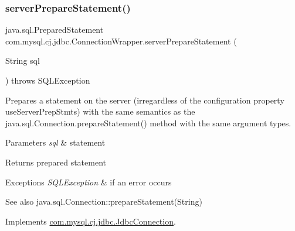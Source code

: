 \subsubsection{\texorpdfstring{server\+Prepare\+Statement()}{serverPrepareStatement()}\hspace{0.1cm}{\footnotesize\ttfamily [1/6]}}
{\footnotesize\ttfamily java.\+sql.\+Prepared\+Statement com.\+mysql.\+cj.\+jdbc.\+Connection\+Wrapper.\+server\+Prepare\+Statement (\begin{DoxyParamCaption}\item[{String}]{sql }\end{DoxyParamCaption}) throws S\+Q\+L\+Exception}

Prepares a statement on the server (irregardless of the configuration property \textquotesingle{}use\+Server\+Prep\+Stmts\textquotesingle{}) with the same semantics as the java.\+sql.\+Connection.\+prepare\+Statement() method with the same argument types.


\begin{DoxyParams}{Parameters}
{\em sql} & statement \\
\hline
\end{DoxyParams}
\begin{DoxyReturn}{Returns}
prepared statement 
\end{DoxyReturn}

\begin{DoxyExceptions}{Exceptions}
{\em S\+Q\+L\+Exception} & if an error occurs \\
\hline
\end{DoxyExceptions}
\begin{DoxySeeAlso}{See also}
java.\+sql.\+Connection\+::prepare\+Statement(\+String) 
\end{DoxySeeAlso}


Implements \mbox{\hyperlink{interfacecom_1_1mysql_1_1cj_1_1jdbc_1_1_jdbc_connection_add415475386bd7577301fddbdd5518b8}{com.\+mysql.\+cj.\+jdbc.\+Jdbc\+Connection}}.

\mbox{\label{classcom_1_1mysql_1_1cj_1_1jdbc_1_1_connection_wrapper_a86037101987ec03d10b75dbba23a8dff}} 
